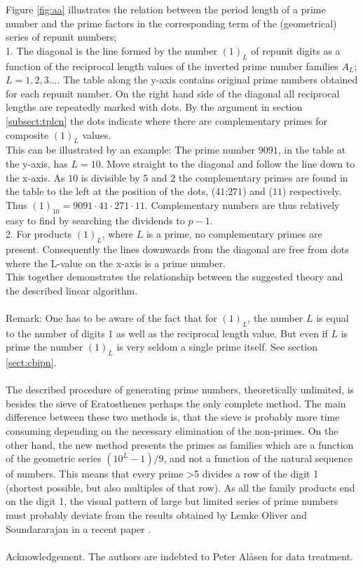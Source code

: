 \documentclass[10pt,twoside,a4paper]{amsart}
\begin{document}
Figure \ref{fig:aa} illustrates the relation between the period length of a prime number and the prime factors in the corresponding term of the (geometrical) series of repunit numbers;\\
1. The diagonal is the line formed by the number $(1)_L$ of repunit digits as a function of the reciprocal length values of the inverted prime number families $A_{L}$; $L = 1,2,3...$. The table along the y-axis contains original prime numbers obtained for each repunit number. On the right hand side of the diagonal all reciprocal lengths are repeatedly marked with dots. By the argument in section \ref{subsect:tplcn} the dots indicate where there are complementary primes for composite $(1)_L$ values.\\
This can be illustrated by an example: The prime number $9091$, in the table at the y-axis, has $L=10$. Move straight to the diagonal and follow the line down to the x-axis. As $10$ is divisible by $5$ and $2$ the complementary primes are found in the table to the left at the position of the dots, ($41$;$271$) and ($11$) respectively. Thus $(1)_{10}=9091\cdot 41\cdot 271\cdot 11$. Complementary numbers are thus relatively easy to find by searching the dividends to $p-1$.\\
2. For products $(1)_L$, where $L$ is a prime, no complementary primes are present. Consequently the lines downwards from the diagonal are free from dots where the L-value on the x-axis is a prime number.\\
This together demonstrates the relationship between the suggested theory and the described linear algorithm.\\
\\
Remark: One has to be aware of the fact that for $(1)_L$, the number $L$ is equal to the number of digits 1 as well as the reciprocal length value. But even if $L$ is prime the number $(1)_L$ is very seldom a single prime itself. See section \ref{sect:cbipn}.\\    
\\
The described procedure of generating prime numbers, theoretically unlimited, is besides the sieve of Eratosthenes perhaps the only complete method. The main difference between these two methods is, that the sieve is probably more time consuming depending on the necessary elimination of the non-primes. On the other hand, the new method presents the primes as families which are a function of the geometric series $(10^{L}-1)/9$, and not a function of the natural sequence of numbers. This means that every prime {\textgreater}5 divides a row of the digit 1 (shortest possible, but also multiples of that row). As all the family products end on the digit 1, the visual pattern of large but limited series of prime numbers must probably deviate from the results obtained by Lemke Oliver and Soundararajan in a recent paper \cite{Soundararajan}.\\
\\
Acknowledgement. The authors are indebted to Peter Al{\aa}sen for data treatment.
\end{document}

